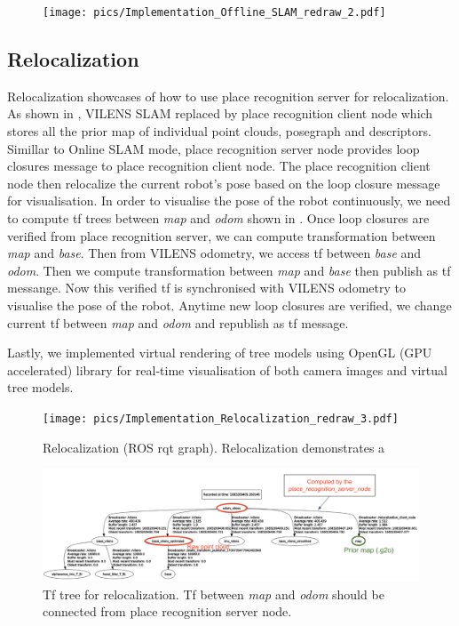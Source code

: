\begin{figure}[t]
  \centering
  \texttt{[image: pics/Implementation\_Offline\_SLAM\_redraw\_2.pdf]}
  \caption{}
  \label{fig:implementation_offline_slam}
\end{figure}


\subsection{Relocalization}
Relocalization showcases of how to use place recognition server for relocalization. As shown in , VILENS SLAM replaced by place recognition client node which stores all the prior map of individual point clouds, posegraph and descriptors. Simillar to Online SLAM mode, place recognition server node provides loop closures message to place recognition client node. The place recognition client node then relocalize the current robot's pose based on the loop closure message for visualisation. 
In order to visualise the pose of the robot continuously, we need to compute tf trees between \emph{map} and \emph{odom} shown in . Once loop closures are verified from place recognition server, we can compute transformation between \emph{map} and \emph{base}. Then from VILENS odometry, we access tf between \emph{base} and \emph{odom}. Then we compute transformation between \emph{map} and \emph{base} then publish as tf messange. Now this verified tf is synchronised with VILENS odometry to visualise the pose of the robot. Anytime new loop closures are verified, we change current tf between \emph{map} and \emph{odom} and republish as tf message. 

Lastly, we implemented virtual rendering of tree models using OpenGL (GPU accelerated) library for real-time visualisation of both camera images and virtual tree models. 
\begin{figure}[t]
  \centering
  \texttt{[image: pics/Implementation\_Relocalization\_redraw\_3.pdf]}
  \caption{Relocalization (ROS rqt graph). Relocalization demonstrates a }
  \label{fig:implementation_relocalization}
\end{figure}



\begin{figure}[t]
  \centering
  \includegraphics[width=0.99\columnwidth]{pics/impelementation_relocalization_tf.png}
  \caption{Tf tree for relocalization. Tf between \emph{map} and \emph{odom} should be connected from place recognition server node.}
  \label{fig:implementation_relocalization_tf}
\end{figure}